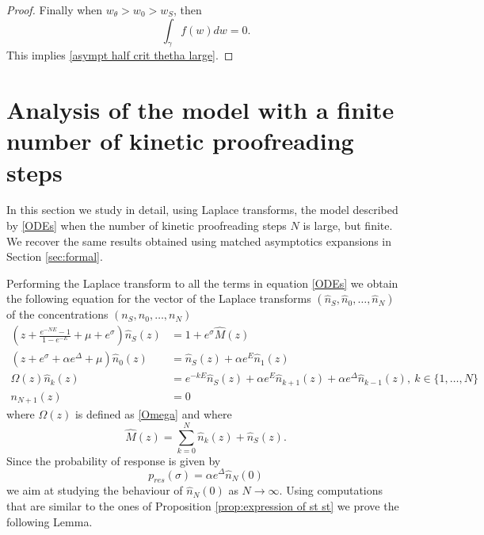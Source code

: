 \documentclass{article}
\numberwithin{equation}{section}
\theoremstyle{plain}
\begin{document}
\begin{proof}
Finally when $ w_\theta > w_0> w_S $, then 
\[
\int_{\gamma} f(w)  dw = 0. 
\]
This implies \eqref{asympt half crit thetha large}. 
\end{proof}

\section{Analysis of the model with a finite number of kinetic proofreading steps} \label{sec:rigorous}
In this section we study in detail, using Laplace transforms, the model described by \eqref{ODEs} when the number of kinetic proofreading steps $N$ is large, but finite. We  recover the same results obtained using matched asymptotics expansions in Section \ref{sec:formal}. 



Performing the Laplace transform to all the terms in equation \eqref{ODEs} we obtain the following equation for the vector of the Laplace transforms $(\hat{n}_S, \hat{n}_0, \dots, \hat{n}_{N}) $ of the concentrations $(n_S, n_0, \dots, n_{N}) $
\begin{align} \label{Laplace eq}
    \left( z + \frac{e^{- N E}-1}{1- e^{-E}} + \mu  + e^\sigma \right) \hat{n}_S(z)&= 1+ e^\sigma \hat{M}(z) \nonumber \\ 
    \left( z + e^\sigma + \alpha e^\Delta + \mu \right) \hat{n}_0 (z)&=  \hat{n}_S(z) + \alpha e^E \hat{n}_1 (z)\nonumber \\
    \Omega(z) \hat{n}_k(z)&=  e^{- k E} \hat{n}_S (z)+ \alpha e^E\hat{n}_{k+1} (z)+ \alpha e^\Delta \hat{n}_{k-1}(z), \ k \in \{1, \dots, N\} \\
    n_{N+1}(z)&=0 \nonumber
\end{align}
where $\Omega(z) $ is defined as \eqref{Omega} and where 
\[
\hat{M}(z)= \sum_{k=0}^{N } \hat{n}_k (z)  + \hat{n}_S(z) .  
\]
Since the probability of response is given by 
\[
p_{res}(\sigma) = \alpha e^\Delta \hat{n}_N(0)
\]
we aim at studying the behaviour of $\hat{n}_N (0) $ as $N \to \infty$. 
Using computations that are similar to the ones of Proposition \ref{prop:expression of st st} we prove the following Lemma. 
\end{document}
